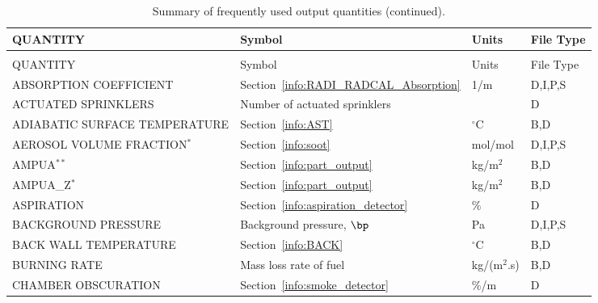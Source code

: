 \documentclass[11pt]{book}
\begin{document}
\begin{longtable}{@{\extracolsep{\fill}}|l|l|l|l|}
\caption[Frequently used output quantities]{Summary of frequently used output quantities.}
\label{tab:output} \\
\hline
{\ct QUANTITY}                           & Symbol                                        & Units          & File Type    \\
\hline \hline
\endfirsthead
\caption[]{Summary of frequently used output quantities (continued).} \\
\hline
{\ct QUANTITY}                           & Symbol                                        & Units          & File Type    \\
\hline \hline
\endhead
{\ct ABSORPTION COEFFICIENT}                    & Section~\ref{info:RADI_RADCAL_Absorption}     & 1/m            & D,I,P,S      \\ \hline
{\ct ACTUATED SPRINKLERS}                       & Number of actuated sprinklers                 &                & D            \\ \hline
{\ct ADIABATIC SURFACE TEMPERATURE}             & Section~\ref{info:AST}                        & $^\circ$C      & B,D          \\ \hline
{\ct AEROSOL VOLUME FRACTION}$^*$               & Section~\ref{info:soot}                       & mol/mol        & D,I,P,S      \\ \hline
{\ct AMPUA}$^{**}$                              & Section~\ref{info:part_output}                & kg/m$^2$       & B,D          \\ \hline
{\ct AMPUA\_Z}$^{*}$                            & Section~\ref{info:part_output}                & kg/m$^2$       & B,D          \\ \hline
{\ct ASPIRATION}                                & Section~\ref{info:aspiration_detector}        & \%             & D            \\ \hline
{\ct BACKGROUND PRESSURE}                       & Background pressure, $\bp$                    & Pa             & D,I,P,S      \\ \hline
{\ct BACK WALL TEMPERATURE}                     & Section~\ref{info:BACK}                       & $^\circ$C      & B,D          \\ \hline
{\ct BURNING RATE}                              & Mass loss rate of fuel                        & \si{kg/(m$^2$.s)} & B,D       \\ \hline
{\ct CHAMBER OBSCURATION}                       & Section~\ref{info:smoke_detector}             & \%/m           & D            \\ \hline

\end{longtable}
\end{document}
